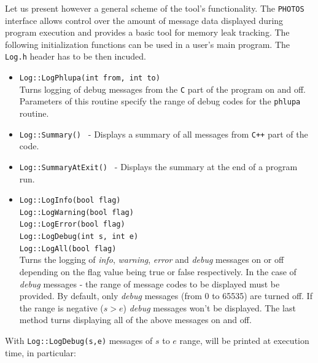 \documentclass[]{Photos_interface_design}
\begin{document}
Let us present however a general scheme of the tool's
functionality.  The {\tt PHOTOS} interface allows control over the
amount of message data displayed during program execution and
provides a basic tool for memory leak tracking. The following initialization
functions can be used in a user's main program.  
The  {\tt Log.h} header has to be then incuded.
\begin{itemize}
  \item {\tt Log::LogPhlupa(int from, int to) } \\
        Turns logging of debug messages from the {\tt C} part of the program on and off.
        Parameters of this routine specify the range of debug codes for the {\tt phlupa} routine.
  \item {\tt Log::Summary() } - Displays a summary of all messages from {\tt C++} part of the code.
  \item {\tt Log::SummaryAtExit() } - Displays the summary at the end of a program run.
  \item {\tt Log::LogInfo(bool flag) } \\
        {\tt Log::LogWarning(bool flag) } \\
        {\tt Log::LogError(bool flag) } \\
        {\tt Log::LogDebug(int s, int e) } \\
        {\tt Log::LogAll(bool flag)} \\
        Turns the logging of \textit{info}, \textit{warning}, \textit{error} and \textit{debug} messages on or off depending
        on the flag value being true or false respectively. In the case of \textit{debug} messages - the range of message codes
        to be displayed must be provided. By default, only \textit{debug} messages
        (from 0 to 65535) are turned off. If the range is negative ($s>e$) \textit{debug} messages
        won't be displayed. The last method turns displaying all of the above messages on and off.
\end{itemize}

With  {\tt Log::LogDebug(s,e)}  messages of $s$ to $e$ range, 
will be printed at execution time, in particular:
\end{document}
